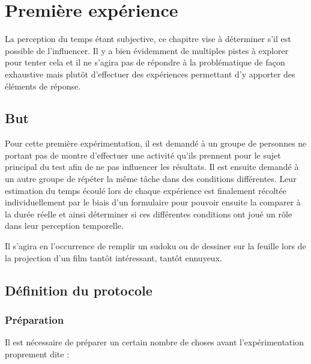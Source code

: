 \documentclass[12pt,fleqn,oneside,openany]{book} %
\begin{document}
\section{Première expérience} \label{sec:exp1}
La perception du temps étant subjective, ce chapitre vise à déterminer s'il est possible de l'influencer. Il y a bien évidemment de multiples pistes à explorer pour tenter cela et il ne s'agira pas de répondre à la problématique de façon exhaustive mais plutôt d'effectuer des expériences permettant d'y apporter des éléments de réponse.

\subsection{But} \label{ssec:but1}
Pour cette première expérimentation, il est demandé à un groupe de personnes ne portant pas de montre d'effectuer une activité qu'ils prennent pour le sujet principal du test afin de ne pas influencer les résultats. Il est ensuite demandé à un autre groupe de répéter la même tâche dans des conditions différentes. Leur estimation du temps écoulé lors de chaque expérience est finalement récoltée individuellement par le biais d'un formulaire pour pouvoir ensuite la comparer à la durée réelle et ainsi déterminer si ces différentes conditions ont joué un rôle dans leur perception temporelle.

Il s'agira en l'occurrence de remplir un sudoku ou de dessiner sur la feuille lors de la projection d'un film tantôt intéressant, tantôt ennuyeux. 


\subsection{Définition du protocole} \label{ssec:defProto1}

\subsubsection{Préparation} \label{sssec:preparation1}
Il est nécessaire de préparer un certain nombre de choses avant l'expérimentation proprement dite :
\end{document}
